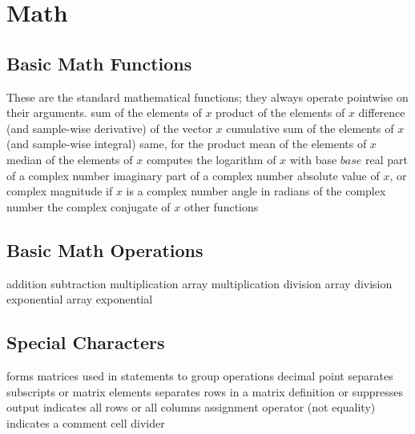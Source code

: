 \section{Math}{}
\subsection{Basic Math Functions}{These are the standard mathematical functions; they always
    operate pointwise on their arguments.}
	{sum of the elements of $x$}
	{product of the elements of $x$}
	{difference (and sample-wise derivative) of the vector $x$}
	{cumulative sum of the elements of $x$ (and sample-wise integral)}
	{same, for the product}
	{mean of the elements of $x$}
	{median of the elements of $x$}
	{computes the logarithm of $x$ with base $base$}
	{real part of a complex number}
	{imaginary part of a complex number}
	{absolute value of $x$, or complex magnitude if $x$ is a complex number}
	{angle in radians of the complex number}
	{the complex conjugate of $x$}
	{other functions}

\subsection{Basic Math Operations}{}
\cmdOper{+}	{addition}
\cmdOper{-}	{subtraction}
\cmdOper{*}	{multiplication}
	{array multiplication}
\cmdOper{/}	{division}
	{array division}
\cmdOper{\expon}	{exponential}
	{array exponential}

\subsection{Special Characters}{}
\cmdOper{[]}	{forms matrices}
\cmdOper{()}	{used in statements to group operations}
	{decimal point}
\cmdOper{,! }	{separates subscripts or matrix elements}
\cmdOper{;}	{separates rows in a matrix definition or suppresses output}
\cmdOper{:}	{indicates all rows or all columns}
\cmdOper{=}	{assignment operator (not equality)}
\cmdOper{\%}	{indicates a comment}
\cmdOper{\%\%}	{cell divider}

